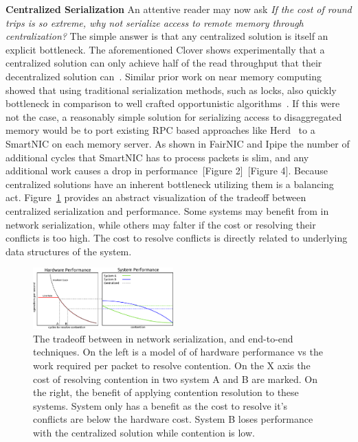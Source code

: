 

\textbf{Centralized Serialization} 
An attentive reader may now ask \textit{If the cost of round trips is so
extreme, why not serialize access to remote memory through centralization?} The
simple answer is that any centralized solution is itself an explicit bottleneck.
The aforementioned Clover shows experimentally that a centralized solution can
only achieve half of the read throughput that their decentralized solution
can~\cite{clover}. Similar prior work on near memory computing showed that using
traditional serialization methods, such as locks, also quickly bottleneck in
comparison to well crafted opportunistic algorithms~\cite{near-memory-structs}.
If this were not the case, a reasonably simple solution for serializing access
to disaggregated memory would be to port existing RPC based approaches like
Herd~\cite{herd} to a SmartNIC on each memory server. As shown in FairNIC and
Ipipe the number of additional cycles that SmartNIC has to process packets is
slim, and any additional work causes a drop in performance~\cite{fairnic}[Figure
2]~\cite{ipipe}[Figure 4]. Because centralized solutions have an inherent
bottleneck utilizing them is a balancing act. Figure~\ref{fig:middlebox_model}
provides an abstract visualization of the tradeoff between centralized
serialization and performance. Some systems may benefit from in network
serialization, while others may falter if the cost or resolving their conflicts
is too high. The cost to resolve conflicts is directly related to underlying
data structures of the system.

\begin{figure}
    \includegraphics[width=0.48\textwidth]{fig/in_network_tradeoff.pdf}

    \caption{The tradeoff between in network serialization, and end-to-end
    techniques. On the left is a model of of hardware performance vs the work
    required per packet to resolve contention. On the X axis the cost of
    resolving contention in two system A and B are marked. On the right, the
    benefit of applying contention resolution to these systems. System only has
    a benefit as the cost to resolve it's conflicts are below the hardware cost.
    System B loses performance with the centralized solution while contention is
    low.}

    \label{fig:middlebox_model}
\end{figure}

